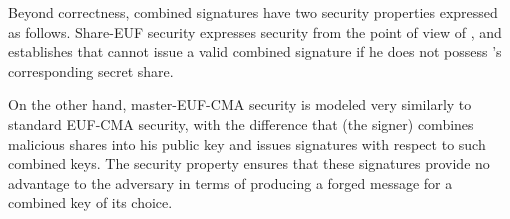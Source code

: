   Beyond correctness, combined signatures have two security properties expressed
  as follows. \textsf{Share-EUF} security expresses security from the
  point of view of \alice{}, and establishes that \bob{} cannot issue a
  valid combined signature if he does not possess \alice's corresponding secret
  share. 


  On the other hand, \textsf{master-EUF-CMA} security is modeled very
  similarly to standard \textsf{EUF-CMA} security, with the difference
  that \bob{} (the signer) combines malicious shares into his public key and
  issues signatures with respect to such combined keys. The security
  property ensures that these signatures provide no advantage to the adversary
  in terms of producing a forged message for a combined key of its choice.

